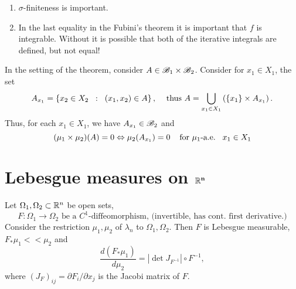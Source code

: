 \begin{remark}
    $\quad$
    \begin{enumerate}
        \item $\sigma$-finiteness is important.
        \item In the last equality in the Fubini's theorem it is important that $f$ is integrable. Without it is possible that both of the iterative integrals are defined, but not equal!
    \end{enumerate}
\end{remark}
\begin{corollary}
    In the setting of the theorem, consider $A\in\mathscr{B}_1\times \mathscr{B}_2$. Consider for $x_1\in X_1$, the set \[A_{x_1}=\left\{x_2\in X_2\hspace{2mm}:\hspace{2mm} (x_1,x_2)\in A\right\},\hspace{3mm}\text{ thus } A=\bigcup_{x_1\in X_1}\left(\left\{x_1\right\}\times A_{x_1}\right).\] 
Thus, for each $x_1\in X_1$, we have $A_{x_1}\in\mathscr{B}_2$ and \[(\mu_1\times\mu_2)(A)=0\Leftrightarrow \mu_2(A_{x_1})=0\hspace{4mm}\text{for }\mu_1\text{-a.e.} \hspace{3mm} x_1\in X_1 \]
\end{corollary}

\section*{Lebesgue measures on $\bold{\mathbb{R}^n}$}
\begin{theorem}
    Let $\Omega_1,\Omega_2\subset \mathbb{R}^n$ be open sets, 
    \[F:\Omega_1\rightarrow \Omega_2\text{ be a }C^1\text{-diffeomorphism, (invertible, has cont. first derivative.)}\]
    Consider the restriction $\mu_1,\mu_2$ of $\lambda_n$ to $\Omega_1,\Omega_2$. Then $F$ is Lebesgue measurable, $F_*\mu_1<<\mu_2$ and 
    \[\frac{d(F_*\mu_1)}{d\mu_2}=\left|\det J_{F^{-1}}\right|\circ F^{-1},\]
    where $(J_F)_{ij}=\partial F_i/\partial x_j$ is the Jacobi matrix of $F$.
\end{theorem}

